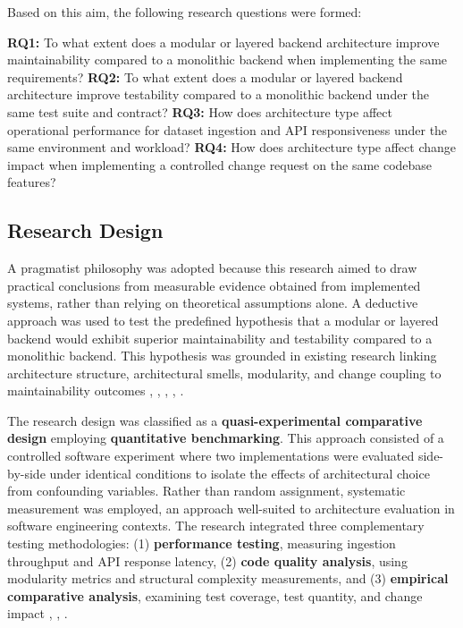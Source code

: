 ﻿\documentclass[conference]{IEEEtran}
\begin{document}
Based on this aim, the following research questions were formed:

\hfill \break
\textbf{RQ1:} To what extent does a modular or layered backend architecture improve maintainability compared to a monolithic backend when implementing the same requirements?
\hfill \break
\textbf{RQ2:} To what extent does a modular or layered backend architecture improve testability compared to a monolithic backend under the same test suite and contract?
\hfill \break
\textbf{RQ3:} How does architecture type affect operational performance for dataset ingestion and API responsiveness under the same environment and workload?
\hfill \break
\textbf{RQ4:} How does architecture type affect change impact when implementing a controlled change request on the same codebase features?

\subsection{Research Design}
A pragmatist philosophy was adopted because this research aimed to draw practical conclusions from measurable evidence obtained from implemented systems, rather than relying on theoretical assumptions alone. A deductive approach was used to test the predefined hypothesis that a modular or layered backend would exhibit superior maintainability and testability compared to a monolithic backend. This hypothesis was grounded in existing research linking architecture structure, architectural smells, modularity, and change coupling to maintainability outcomes \cite{b1}, \cite{b3}, \cite{b4}, \cite{b6}, \cite{b7}. 

The research design was classified as a \textbf{quasi-experimental comparative design} employing \textbf{quantitative benchmarking}. This approach consisted of a controlled software experiment where two implementations were evaluated side-by-side under identical conditions to isolate the effects of architectural choice from confounding variables. Rather than random assignment, systematic measurement was employed, an approach well-suited to architecture evaluation in software engineering contexts. The research integrated three complementary testing methodologies: (1) \textbf{performance testing}, measuring ingestion throughput and API response latency, (2) \textbf{code quality analysis}, using modularity metrics and structural complexity measurements, and (3) \textbf{empirical comparative analysis}, examining test coverage, test quantity, and change impact \cite{b4}, \cite{b6}, \cite{b7}. 
\end{document}
